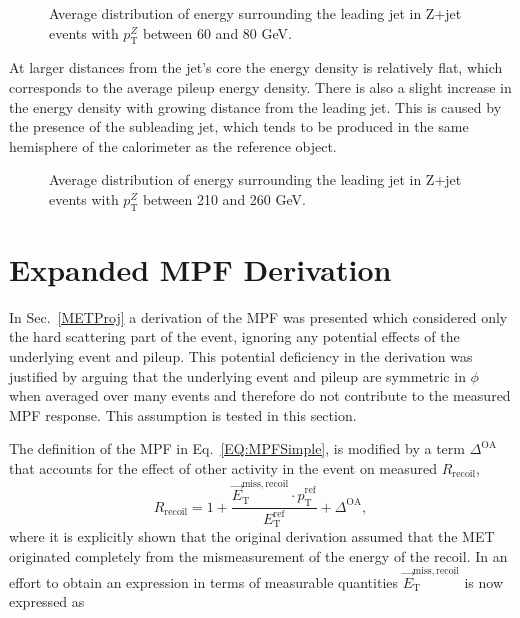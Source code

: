 \begin{figure}[!ht]
 \begin{center}
 \end{center}
 \caption[Recoil energy distribution in Z+jet, 60-80 GeV]
 {\small Average distribution of energy surrounding the leading jet in Z+jet events with $p_{\mathrm T}^{Z}$ between 60 and 80 GeV. }
 \label{Fig:EMShape60-80}
\end{figure}

At larger distances from the jet's core the energy density is relatively flat, which corresponds to the average pileup energy density.  
There is also a slight increase in the energy density with growing distance from the leading jet.  
This is caused by the presence of the subleading jet, which tends to be produced in the same hemisphere of the calorimeter as the reference object.  


\begin{figure}[!ht]
 \begin{center}
 \end{center}
 \caption[Recoil energy distribution in Z+jet, 210-260 GeV]
 {\small Average distribution of energy surrounding the leading jet in Z+jet events with $p_{\mathrm T}^{Z}$ between 210 and 260 GeV. }
 \label{Fig:EMShape210-260}
\end{figure}

\section{Expanded MPF Derivation}

In Sec.~\ref{METProj} a derivation of the MPF was presented which considered only the hard scattering part of the event, ignoring any potential effects of the underlying event and pileup.  
This potential deficiency in the derivation was justified by arguing that the underlying event and pileup are symmetric in $\phi$ when averaged over many events and therefore do not contribute to the measured MPF response.  
This assumption is tested in this section.  

The definition of the MPF in Eq.~\ref{EQ:MPFSimple}, is modified by a term $\Delta^{\mathrm{OA}}$ that accounts for the effect of other activity in the event on measured $R_{\mathrm{recoil}}$, 
\begin{equation}
  \label{Eq:MPFWithDelta}
  R_{\mathrm{recoil}}=1+\frac{\vec{E}_{\mathrm T}^{\mathrm{miss, recoil}}\cdot\hat{p}_{\mathrm T}^{\mathrm{ref}}}{E_{\mathrm T}^{\mathrm{ref}}} + \Delta^{\mathrm{OA}}, 
\end{equation}
\noindent
where it is explicitly shown that the original derivation assumed that the MET originated completely from the mismeasurement of the energy of the recoil.  
In an effort to obtain an expression in terms of measurable quantities $\vec{E}_{\mathrm T}^{\mathrm{miss, recoil}}$ is now expressed as 

